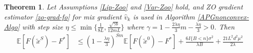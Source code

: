 \documentclass{article}
\newcommand*{\E}{\mathbb{E}}
\newtheorem{theorem}{Theorem}[section]
\theoremstyle{definition}
\theoremstyle{remark}
\begin{document}
\begin{theorem}\label{PL-Zoo}
Let Assumptions \ref{Lip-Zoo} and \ref{Var-Zoo} hold, and  ZO gradient estimator \eqref{zo-grad-fo} for mix gradient $\hat{v}_k$ is  used  in  Algorithm \ref{APGnonconvex-Algo} with step size $\eta \leq \min\{\frac{1}{8L}, \frac{\sqrt{\gamma b}}{12 m L }\}$ where $\gamma = 1-\frac{2\lambda\eta}{3} m-\frac{\lambda\eta}{3} > 0$. Then 
\begin{equation}\label{PL-eq-error}
\begin{split}
\E[F(\tilde{x}^S) - {F}^*] & \leq   \left(1-\frac{\lambda\eta}{3}\right)^{Sm} \E[F(\tilde{x}^0) - {F}^*] + \frac{6I\{B < n\} \sigma ^2}{\lambda B}+\frac{21 L^2 d^2 \mu^2}{2\lambda}
\end{split}
\end{equation}
\end{theorem}
\end{document}
